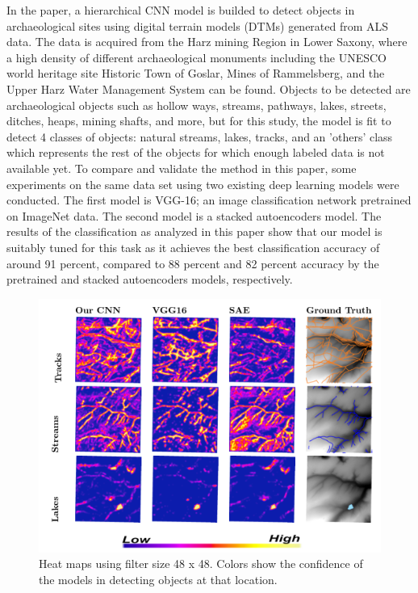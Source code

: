 \documentclass[journal]{IEEEtran}
\begin{document}
	In the paper\cite{AOD}, a hierarchical CNN model is builded to detect objects in archaeological sites
	using digital terrain models (DTMs) generated from ALS data. 
	The	data is acquired from the Harz mining Region in Lower Saxony, where a high density of different
	archaeological monuments including the UNESCO world heritage site Historic Town of Goslar,
	Mines of Rammelsberg, and the Upper Harz Water Management System can be found. Objects to be detected are archaeological
	objects such as hollow ways, streams, pathways, lakes, streets, ditches, heaps, mining shafts,
	and more, but for this study, the model is fit to detect 4 classes of objects: natural streams, lakes, tracks, and an 'others' class
	which represents the rest of the objects for which enough labeled data is not available yet. To
	compare and validate the method in this paper, some experiments on the same data set using two existing
	deep learning models were conducted. The first model is VGG-16; an image classification network pretrained
	on ImageNet data. The second model is a stacked autoencoders model. The results of the
	classification as analyzed in this paper show that our model is suitably tuned for this task as it
	achieves the best classification accuracy of around 91 percent, compared to 88 percent and 82
	percent accuracy by the pretrained and stacked autoencoders models, respectively.
	\begin{figure}[htbp]
		\centering
		\includegraphics[width=1.0\linewidth]{./picture/fig7.png}
		\caption{Heat maps using filter size 48 x 48. Colors show the confidence of the models in detecting
		objects at that location.}
	  \end{figure}
\end{document}
